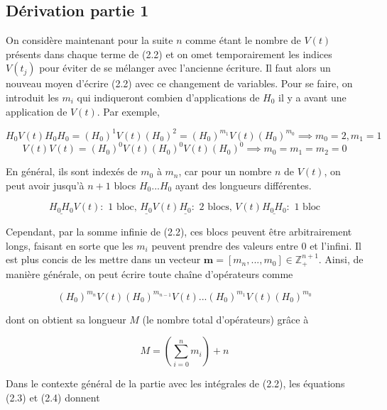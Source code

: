 \subsection{Dérivation partie 1}
On considère maintenant pour la suite $n$ comme étant le nombre de $V(t)$ présents dans chaque terme de (2.2) et on omet temporairement les indices $V(t_j)$ pour éviter de se mélanger avec l'ancienne écriture. Il faut alors un nouveau moyen d'écrire (2.2) avec ce changement de variables. Pour se faire, on introduit les $m_i$ qui indiqueront combien d'applications de $H_0$ il y a avant une application de $V(t)$. Par exemple,

\begin{equation*}
    H_0V(t)H_0H_0 = (H_0)^1V(t)(H_0)^2 = (H_0)^{m_1}V(t)(H_0)^{m_0} \implies m_0 = 2, m_1 = 1
\end{equation*}
\begin{equation*}
    V(t)V(t) = (H_0)^0V(t)(H_0)^0V(t)(H_0)^0 \implies m_0 = m_1 = m_2 = 0
\end{equation*}

En général, ils sont indexés de $m_0$ à $m_n$, car pour un nombre $n$ de $V(t)$, on peut avoir jusqu'à $n+1$ blocs $H_0...H_0$ ayant des longueurs différentes.

\begin{equation*}
    \underline{H_0H_0}V(t) : \text{ 1 bloc, } \underline{H_0}V(t)\underline{H_0} : \text{ 2 blocs, } V(t)\underline{H_0H_0} : \text{ 1 bloc}
\end{equation*}



Cependant, par la somme infinie de (2.2), ces blocs peuvent être arbitrairement longs, faisant en sorte que les $m_i$ peuvent prendre des valeurs entre 0 et l'infini. Il est plus concis de les mettre dans un vecteur $\boldsymbol{m} = \left[m_n, ..., m_0\right] \in \mathbb{Z}^{n+1}_+$. Ainsi, de manière générale, on peut écrire toute chaîne d'opérateurs comme 

\begin{equation}
    (H_0)^{m_n}V(t)(H_0)^{m_{n-1}}V(t)...(H_0)^{m_1}V(t)(H_0)^{m_0}
\end{equation}

dont on obtient sa longueur $M$ (le nombre total d'opérateurs) grâce à 

\begin{equation}
    M = \left(\sum_{i=0}^{n}m_i\right) + n
\end{equation}

Dans le contexte général de la partie avec les intégrales de (2.2), les équations (2.3) et (2.4) donnent 


